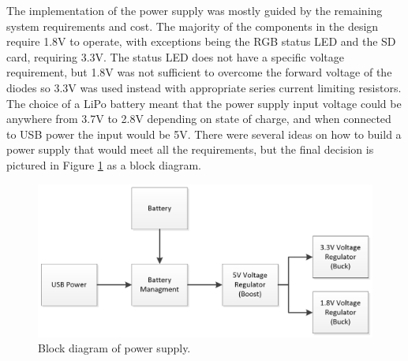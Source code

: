 The implementation of the power supply was mostly guided by the remaining system requirements and cost. 
The majority of the components in the design 
require 1.8V to operate, with exceptions being the RGB status LED and the SD 
card, requiring 3.3V. The status LED does not have a specific voltage 
requirement, but 1.8V was not sufficient to overcome the forward voltage of the 
diodes so 3.3V was used instead with appropriate series current limiting 
resistors. The choice of a LiPo battery meant that the power supply input 
voltage could be anywhere from 3.7V to 2.8V depending on state of charge, and 
when connected to USB power the input would be 5V. There were several ideas on 
how to build a power supply that would meet all the requirements, but the final 
decision is pictured in Figure \ref{fig:BlockDiagram_PowerSupply} as a block 
diagram.

\begin{figure}[!htb]
\centering
\includegraphics[width=\textwidth]{images/BlockDiagram_PowerSupply.png}
\caption{Block diagram of power supply.}
\label{fig:BlockDiagram_PowerSupply}
\end{figure}

